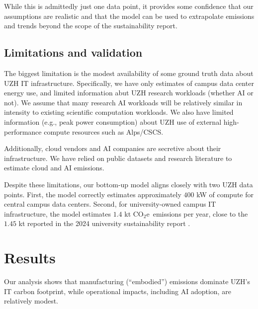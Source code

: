 \documentclass[11pt]{article}
\newcommand{\coe}{CO$_2$e}
\begin{document}
While this is admittedly just one data point, it provides some confidence that our assumptions are realistic and that the model can be used to extrapolate emissions and trends beyond the scope of the sustainability report.

\subsection{Limitations and validation}

The biggest limitation is the modest availability of some ground truth data about UZH IT infrastructure. Specifically, we have only estimates of campus data center energy use, and limited information abut UZH research workloads (whether AI or not). We assume that many research AI workloads will be relatively similar in intensity to existing scientific computation workloads. We also have limited information (e.g., peak power consumption) about UZH use of external high-performance compute resources such as Alps/CSCS.

Additionally, cloud vendors and AI companies are secretive about their infrastructure. We have relied on public datasets and research literature to estimate cloud and AI emissions.

Despite these limitations, our bottom-up model aligns closely with two UZH data points. First, the model correctly estimates approximately $400$ kW of compute for central campus data centers. Second, for university-owned campus IT infrastructure, the model estimates $1.4$ kt \coe\ emissions per year, close to the $1.45$ kt reported in the 2024 university sustainability report \cite{uzh:sustainability:report}.

\section{Results}
\label{sec:results}

Our analysis shows that manufacturing (“embodied”) emissions dominate UZH's IT carbon footprint, while operational impacts, including AI adoption, are relatively modest.
\end{document}
